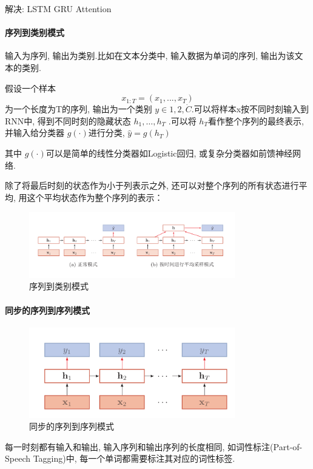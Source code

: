 \documentclass[a4paper]{article}
\begin{document}
解决: LSTM GRU Attention


\paragraph{序列到类别模式}

输入为序列, 输出为类别.比如在文本分类中, 输入数据为单词的序列, 输出为该文本的类别.

假设一个样本$$ x_{1:T}=(x_1, ...,  x_T)$$ 为一个长度为T的序列, 输出为一个类别 $y \in {1,  2,  \dot C}$.可以将样本x按不同时刻输入到RNN中, 得到不同时刻的隐藏状态 $h_1,  \dots,  h_T$ .可以将 $h_T$看作整个序列的最终表示, 并输入给分类器 $g(\cdot)$进行分类,  $\hat{y}=g(h_T)$

其中 $g(\cdot)$可以是简单的线性分类器如Logistic回归, 或复杂分类器如前馈神经网络.

除了将最后时刻的状态作为小于列表示之外, 还可以对整个序列的所有状态进行平均, 用这个平均状态作为整个序列的表示：
\begin{figure}[!htb]
    \center
\includegraphics[width=0.8\textwidth]{RNN_model1.png}
\caption{序列到类别模式}
\end{figure}


\paragraph{同步的序列到序列模式}

\begin{figure}[!htb]
    \center
\includegraphics[width=0.8\textwidth]{RNN_model2.png}
\caption{同步的序列到序列模式}
\end{figure}
每一时刻都有输入和输出, 输入序列和输出序列的长度相同, 如词性标注(Part-of-Speech Tagging)中, 每一个单词都需要标注其对应的词性标签.
\end{document}
